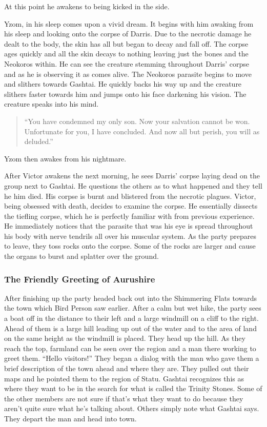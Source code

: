 At this point he awakens to being kicked in the side.

Yzom, in his sleep comes upon a vivid dream. It begins with him awaking from his sleep and looking onto the corpse of Darris. Due to the necrotic damage he dealt to the body, the skin has all but began to decay and fall off. The corpse ages quickly and all the skin decays to nothing leaving just the bones and the Neokoros within. He can see the creature stemming throughout Darris' corpse and as he is observing it as comes alive. The Neokoros parasite begins to move and slithers towards Gashtai. He quickly backs his way up and the creature slithers faster towards him and jumps onto his face darkening his vision. The creature speaks into his mind.

\begin{quote}
	``You have condemned my only son. Now your salvation cannot be won. Unfortunate for you, I have concluded. And now all but perish, you will as deluded.''
\end{quote}

Yzom then awakes from his nightmare.

After Victor awakens the next morning, he sees Darris' corpse laying dead on the group next to Gashtai. He questions the others as to what happened and they tell he him died. His corpse is burnt and blistered from the necrotic plagues. Victor, being obsessed with death, decides to examine the corpse. He essentially dissects the tiefling corpse, which he is perfectly familiar with from previous experience. He immediately notices that the parasite that was his eye is spread throughout his body with nerve tendrils all over his muscular system. As the party prepares to leave, they toss rocks onto the corpse. Some of the rocks are larger and cause the organs to burst and splatter over the ground.

\subsubsection{The Friendly Greeting of Aurushire}

After finishing up the party headed back out into the Shimmering Flats towards the town which Bird Person saw earlier. After a calm but wet hike, the party sees a boat off in the distance to their left and a large windmill on a cliff to the right. Ahead of them is a large hill leading up out of the water and to the area of land on the same height as the windmill is placed. They head up the hill. As they reach the top, farmland can be seen over the region and a man there working to greet them. ``Hello visitors!'' They began a dialog with the man who gave them a brief description of the town ahead and where they are. They pulled out their maps and he pointed them to the region of Statu. Gashtai recognizes this as where they want to be in the search for what is called the Trinity Stones. Some of the other members are not sure if that's what they want to do because they aren't quite sure what he's talking about. Others simply note what Gashtai says. They depart the man and head into town.

